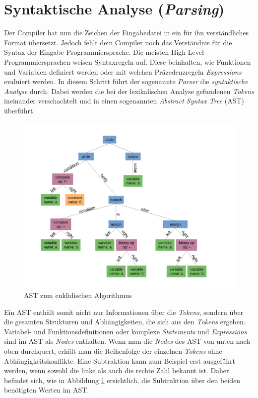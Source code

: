 \section{Syntaktische Analyse (\textit{Parsing})}
Der Compiler hat nun die Zeichen der Eingabedatei in ein für ihn verständliches Format übersetzt.
Jedoch fehlt dem Compiler noch das Verständnis für die Syntax der Eingabe-Programmiersprache.
Die meisten High-Level Programmiersprachen weisen Syntaxregeln auf. Diese beinhalten, wie Funktionen und Variablen definiert werden oder mit welchen Präzedenzregeln \textit{Expressions} evaluiert werden.
In diesem Schritt führt der sogenannte \textit{Parser} die \textit{syntaktische Analyse} durch.
Dabei werden die bei der lexikalischen Analyse gefundenen \textit{Tokens} ineinander verschachtelt und in einen sogenannten \textit{Abstract Syntax Tree} (AST) überführt.

\begin{figure}[H]
    \centering
    \includegraphics[scale=0.4]{resources/images/AST.pdf}
    \caption[AST zum euklidischen Algorithmus. (https://en.wikipedia.org/wiki/Abstract\_syntax\_tree, besucht am 5.8.2024)]{AST zum euklidischen Algorithmus}
    \label{fig:syntax-tree}
\end{figure}

Ein AST enthält somit nicht nur Informationen über die \textit{Tokens}, sondern über die gesamten Strukturen und Abhängigkeiten, die sich aus den \textit{Tokens} ergeben.
Variabel- und Funktionsdefinitionen oder komplexe \textit{Statements} und \textit{Expressions} sind im AST als \textit{Nodes} enthalten.
Wenn man die \textit{Nodes} des AST von unten nach oben durchquert, erhält man die Reihenfolge der einzelnen \textit{Tokens} ohne Abhängigkeitskonflikte.
Eine Subtraktion kann zum Beispiel erst ausgeführt werden, wenn sowohl die linke als auch die rechte Zahl bekannt ist.
Daher befindet sich, wie in Abbildung \ref{fig:syntax-tree} ersichtlich, die Subtraktion über den beiden benötigten Werten im AST.

